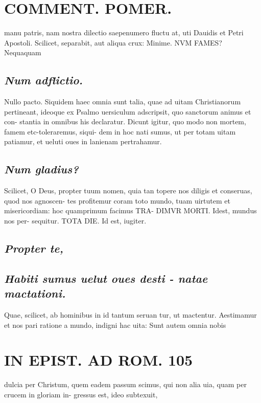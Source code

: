 \documentclass{article}
\begin{document}
\begin{pages}
\section*{COMMENT. POMER.  }\pstart manu patris, nam nostra dilectio saepenumero fluctu at, uti Dauidis et Petri Apostoli.  \pend\pstart Scilicet, separabit, aut aliqua crux: Minime. NVM FAMES? Nequaquam  \pend
{}
{}
\subsection*{\textit{Num adflictio. }}\pstart Nullo pacto. Siquidem haec omnia sunt talia, quae ad uitam Christianorum pertineant, ideoque ex Psalmo uersiculum adscripsit, quo sanctorum animus et con- stantia in omnibus his declaratur. Dicunt igitur, quo modo non mortem, famem etc-toleraremus, siqui- dem in hoc nati sumus, ut per totam uitam patiamur, et ueluti oues in lanienam pertrahamur.  \pend
{}
{}
\subsection*{\textit{Num gladius? }}\pstart Scilicet, O Deus, propter tuum nomen, quia tan topere nos diligis et conseruas, quod nos agnoscen- tes profitemur coram toto mundo, tuam uirtutem et misericordiam: hoc quamprimum facimus TRA- DIMVR MORTI. Idest, mundus nos per- sequitur. TOTA DIE. Id est, iugiter.   \pend
{}
{}
\subsection*{\textit{Propter te, }}
{}
\subsection*{\textit{Habiti sumus uelut oues desti - natae mactationi. }}\pstart Quae, scilicet, ab hominibus in id tantum seruan tur, ut mactentur. Aestimamur et nos pari ratione a mundo, indigni hac uita: Sunt autem omnia nobis  \pend
\section*{IN EPIST. AD ROM.  105 }
\marginpar{[ p.]}\pstart dulcia per Christum, quem eadem passum scimus, qui non alia uia, quam per crucem in gloriam in- gressus est, ideo subtexuit,  \pend
{}
{}

\end{pages}
\end{document}
